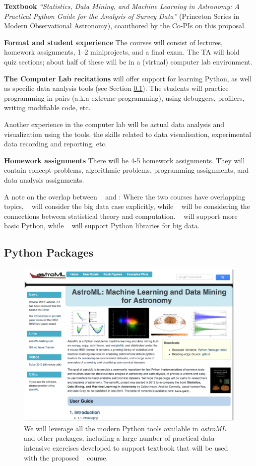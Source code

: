 {\bf Textbook} {\it ``Statistics, Data Mining, and Machine Learning in
  Astronomy: A Practical Python Guide for the Analysis of Survey
  Data''} (Princeton Series in Modern Observational Astronomy),  
coauthored by the Co-PIs on this proposal.

{\bf Format and student experience} 
The courses will consist of lectures, homework assignments, 1--2
miniprojects, and a final exam. The TA will hold quiz sections; about
half of these will be in a (virtual) computer lab environment. 

{\bf The Computer Lab recitations} will offer support for learning
Python, as well as specific data analysis tools (see Section \ref{sec:Python}).
The students will practice programming in pairs (a.k.a extreme
programming), using debuggers, profilers, writing modifiable code, etc.

Another experience in the computer lab will be actual data analysis
and visualization using the tools, the skills related to data
visualisation, experimental data recording and reporting, etc.

{\bf Homework assignments} There will be 4-5 homework
assignments. They will contain concept problems, algorithmic problems,
programming assignments, and data analysis assignments.

A note on the overlap between \statcl~ and \astrocl: Where the two
courses have overlapping topics, \astrocl~ will consider the big data case
explicitly, while \statcl~ will be considering the connections between
statistical theory and computation. \statcl~ will support more basic
Python, while \astrocl~ will support Python libraries for big data.


\subsection{Python Packages} 
\label{sec:Python}

\begin{figure}[!t]
\vskip -1.8in
\includegraphics[width=1.02\hsize,clip]{astroML.eps}
\vskip -2.0in
\caption{We will leverage all the modern Python tools available in {\it astroML} and
other packages, including a large number of practical data-intensive exercises developed to
support textbook that will be used with the proposed \astrocl~ course.} 
\label{Fig:astroML}
\end{figure}


